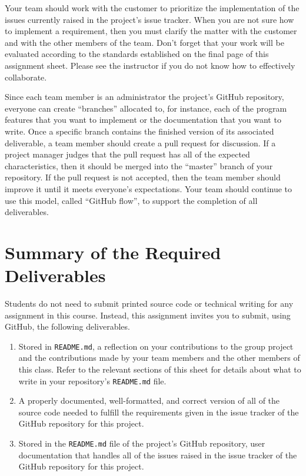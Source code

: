 \documentclass[11pt]{article}
\newcommand{\reflection}{\lstinline{README.md}}
\begin{document}
Your team should work with the customer to prioritize the implementation of the issues currently raised in the project's
issue tracker. When you are not sure how to implement a requirement, then you must clarify the matter with the customer
and with the other members of the team. Don't forget that your work will be evaluated according to the standards
established on the final page of this assignment sheet. Please see the instructor if you do not know how to
effectively collaborate.

Since each team member is an administrator the project's GitHub repository, everyone can create ``branches'' allocated
to, for instance, each of the program features that you want to implement or the documentation that you want to write.
Once a specific branch contains the finished version of its associated deliverable, a team member should create a pull
request for discussion. If a project manager judges that the pull request has all of the expected characteristics, then
it should be merged into the ``master'' branch of your repository. If the pull request is not accepted, then the team
member should improve it until it meets everyone's expectations. Your team should continue to use this model, called
``GitHub flow'', to support the completion of all deliverables.

\section*{Summary of the Required Deliverables}

\noindent Students do not need to submit printed source code or technical writing for any assignment in this course.
Instead, this assignment invites you to submit, using GitHub, the following deliverables.

\begin{enumerate}

\setlength{\itemsep}{0in}

\item Stored in \reflection{}, a reflection on your contributions to the group project and the contributions made by
  your team members and the other members of this class. Refer to the relevant sections of this sheet for details about
  what to write in your repository's \reflection{} file.

\item A properly documented, well-formatted, and correct version of all of the source code needed to fulfill the
  requirements given in the issue tracker of the GitHub repository for this project.

\item Stored in the \reflection{} file of the project's GitHub repository, user documentation that handles all of the
  issues raised in the issue tracker of the GitHub repository for this project.

\end{enumerate}
\end{document}
